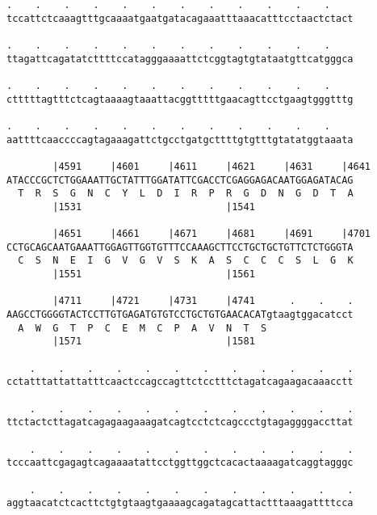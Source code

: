 \documentclass{article}
\begin{document}
\begin{Verbatim}
.    .    .    .    .    .    .    .    .    .    .    .    
tccattctcaaagtttgcaaaatgaatgatacagaaatttaaacatttcctaactctact
                                                            
.    .    .    .    .    .    .    .    .    .    .    .    
ttagattcagatatcttttccatagggaaaattctcggtagtgtataatgttcatgggca
                                                            
.    .    .    .    .    .    .    .    .    .    .    .    
ctttttagtttctcagtaaaagtaaattacggtttttgaacagttcctgaagtgggtttg
                                                            
.    .    .    .    .    .    .    .    .    .    .    .    
aattttcaaccccagtagaaagattctgcctgatgcttttgtgtttgtatatggtaaata
                                                            
        |4591     |4601     |4611     |4621     |4631     |4641
ATACCCGCTCTGGAAATTGCTATTTGGATATTCGACCTCGAGGAGACAATGGAGATACAG
  T  R  S  G  N  C  Y  L  D  I  R  P  R  G  D  N  G  D  T  A
        |1531                         |1541                 
  
        |4651     |4661     |4671     |4681     |4691     |4701
CCTGCAGCAATGAAATTGGAGTTGGTGTTTCCAAAGCTTCCTGCTGCTGTTCTCTGGGTA
  C  S  N  E  I  G  V  G  V  S  K  A  S  C  C  C  S  L  G  K
        |1551                         |1561                 
  
        |4711     |4721     |4731     |4741      .    .    .
AAGCCTGGGGTACTCCTTGTGAGATGTGTCCTGCTGTGAACACATgtaagtggacatcct
  A  W  G  T  P  C  E  M  C  P  A  V  N  T  S               
        |1571                         |1581                 
  
    .    .    .    .    .    .    .    .    .    .    .    .
cctatttattattatttcaactccagccagttctcctttctagatcagaagacaaacctt
                                                            
    .    .    .    .    .    .    .    .    .    .    .    .
ttctactcttagatcagagaagaaagatcagtcctctcagccctgtagaggggaccttat
                                                            
    .    .    .    .    .    .    .    .    .    .    .    .
tcccaattcgagagtcagaaaatattcctggttggctcacactaaaagatcaggtagggc
                                                            
    .    .    .    .    .    .    .    .    .    .    .    .
aggtaacatctcacttctgtgtaagtgaaaagcagatagcattactttaaagattttcca
                                                            

\end{Verbatim}
\end{document}

